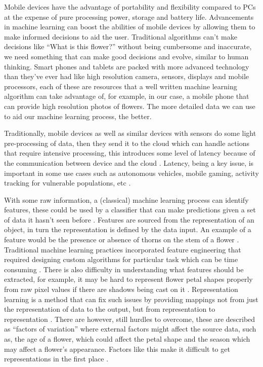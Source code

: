 \documentclass[12pt,a4paper]{report}
\begin{document}
\par

Mobile devices have the advantage of portability and flexibility compared to PCs at the expense of pure processing 
power, storage and battery life. Advancements in machine learning can boost the abilities of mobile devices by allowing 
them to make informed decisions to aid the user. Traditional algorithms can't make decisions like “What is this flower?”
without being cumbersome and inaccurate, we need something that can make good decisions and evolve, similar to human 
thinking. Smart phones and tablets are packed with more advanced technology than they've ever had like high resolution 
camera, sensors, displays and mobile processors, each of these are resources that a well written machine learning 
algorithm can take advantage of, for example, in our case, a mobile phone that can provide high resolution photos of 
flowers. The more detailed data we can use to aid our machine learning process, the better. 

\par

Traditionally, mobile devices as well as similar devices with sensors do some light pre-processing of data, then they 
send it to the cloud which can handle actions that require intensive processing, this introduces some level of latency 
because of the communication between device and the cloud \citep[p. 3]{olascoaga2021hardware}. 
Latency, being a key issue, is important in some use cases such as autonomous vehicles, mobile gaming, activity tracking
for vulnerable populations, etc \citep[pp. 3-4]{olascoaga2021hardware}.


\par

With some raw information, a (classical) machine learning process can identify features, these could be used by a 
classifier that can make predictions given a set of data it hasn't seen before \citep{lecun2015deep}. Features are 
sourced from the representation of an object, in turn the representation is defined by the 
data input. An example of a feature would be the presence or absence of thorns on the stem of a flower 
\citep[p. 22]{goodfellow2016deep}. Traditional machine learning practices incorporated 
feature engineering that required designing custom algorithms for particular task which can be time consuming 
\citep{liu2020representation}. There is also difficulty in understanding what features should be extracted, 
for example, it may be hard to represent flower petal shapes properly from raw pixel values if there are shadows being 
cast on it \citep[p. 23]{goodfellow2016deep}. Representation learning is a method that 
can fix such issues by providing mappings not from just the representation of data to the output, but from 
representation to representation \citep[p. 24]{goodfellow2016deep}. There are however, 
still hurdles to overcome, these are described as “factors of variation” where external factors might affect the source 
data, such as, the age of a flower, which could affect the petal shape and the season which may affect a flower's 
appearance. Factors like this make it difficult to get representations in the first place 
\citep[p. 24]{goodfellow2016deep}.
\end{document}
